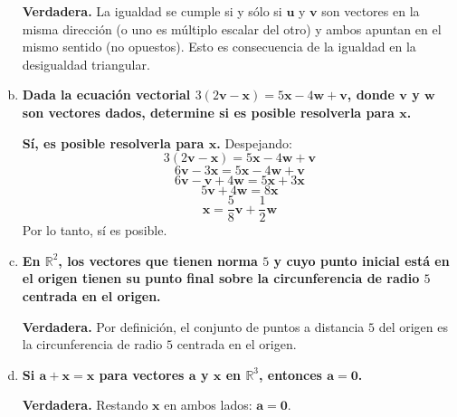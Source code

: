 \begin{prob}
\begin{myproof}
\begin{enumerate}[a)]
\textbf{Verdadera.}  
La igualdad se cumple si y sólo si $\mathbf{u}$ y $\mathbf{v}$ son vectores en la misma dirección (o uno es múltiplo escalar del otro) y ambos apuntan en el mismo sentido (no opuestos).  
Esto es consecuencia de la igualdad en la desigualdad triangular.

\item \textbf{Dada la ecuación vectorial $3(2\mathbf{v}-\mathbf{x})=5\mathbf{x}-4\mathbf{w}+\mathbf{v}$, donde $\mathbf{v}$ y $\mathbf{w}$ son vectores dados, determine si es posible resolverla para $\mathbf{x}$.}

\textbf{Sí, es posible resolverla para $\mathbf{x}$.}  
Despejando:
\[
3(2\mathbf{v}-\mathbf{x}) = 5\mathbf{x} - 4\mathbf{w} + \mathbf{v}
\]
\[
6\mathbf{v} - 3\mathbf{x} = 5\mathbf{x} - 4\mathbf{w} + \mathbf{v}
\]
\[
6\mathbf{v} - \mathbf{v} + 4\mathbf{w} = 5\mathbf{x} + 3\mathbf{x}
\]
\[
5\mathbf{v} + 4\mathbf{w} = 8\mathbf{x}
\]
\[
\mathbf{x} = \frac{5}{8}\mathbf{v} + \frac{1}{2}\mathbf{w}
\]
Por lo tanto, sí es posible.

\item \textbf{En $\mathbb{R}^2$, los vectores que tienen norma $5$ y cuyo punto inicial está en el origen tienen su punto final sobre la circunferencia de radio $5$ centrada en el origen.}

\textbf{Verdadera.}  
Por definición, el conjunto de puntos a distancia $5$ del origen es la circunferencia de radio $5$ centrada en el origen.

\item \textbf{Si $\mathbf{a}+\mathbf{x}=\mathbf{x}$ para vectores $\mathbf{a}$ y $\mathbf{x}$ en $\mathbb{R}^3$, entonces $\mathbf{a}=\mathbf{0}$.}

\textbf{Verdadera.}  
Restando $\mathbf{x}$ en ambos lados: $\mathbf{a} = \mathbf{0}$.
\end{enumerate}
\end{myproof}

\end{prob}

